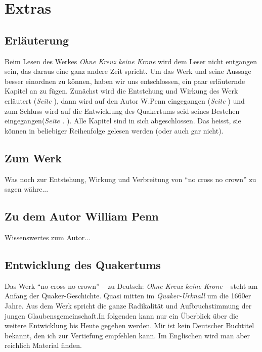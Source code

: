 
\part{Extras}
\chapter{Erläuterung}

Beim Lesen des Werkes \textit{Ohne Kreuz keine Krone} wird dem Leser nicht
entgangen sein, das daraus eine ganz andere Zeit spricht. Um das Werk und seine
Aussage besser einordnen zu können, haben wir uns entschlossen, ein paar
erläuternde Kapitel an zu fügen. Zunächst wird die Entstehung und Wirkung des
Werk erläutert (\textit{Seite \pageref{ref:zum_werk}}), dann wird auf den Autor
W.Penn eingegangen (\textit{Seite \pageref{ref:zum_autor_penn}}) und zum Schluss
wird auf die Entwicklung des Quakertums seid seines Bestehen
eingegangen(\textit{Seite . \pageref{ref:entwiklung_quakertum}}). Alle Kapitel
sind in sich abgeschlossen. Das heisst, sie können in beliebiger Reihenfolge
gelesen werden (oder auch gar nicht).

\chapter{Zum Werk}\label{ref:zum_werk}

Was noch zur Entstehung, Wirkung und Verbreitung von "`no cross no crown"' zu
sagen währe...

\chapter{Zu dem Autor William Penn}\label{ref:zum_autor_penn}

Wissenswertes zum Autor...

\chapter{Entwicklung des Quakertums}\label{ref:entwiklung_quakertum}
Das Werk "`no cross no crown"' -- zu Deutsch: \textit{Ohne Kreuz keine Krone} --
steht am Anfang der Quaker-Geschichte. Quasi mitten im \textit{Quaker-Urknall}
um die 1660er Jahre. Aus dem Werk spricht die ganze Radikalität und
Aufbruchstimmung der jungen Glaubensgemeinschaft.In folgenden kann nur ein
Überblick über die weitere Entwicklung bis Heute gegeben werden. Mir ist kein
Deutscher Buchtitel bekannt, den ich zur Vertiefung empfehlen kann. Im
Englischen wird man aber reichlich Material finden.

